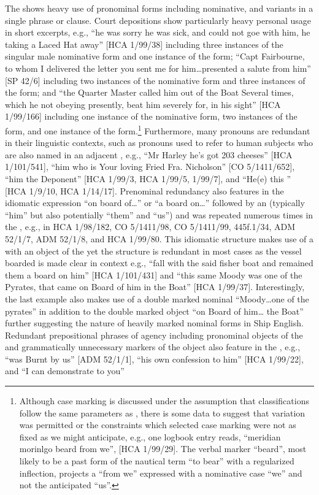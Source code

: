 The  shows heavy use of pronominal forms including nominative,  and  variants in a single phrase or clause. Court depositions show particularly heavy personal  usage in short excerpts, e.g., “he was sorry he was sick, and could not goe with him, he taking a Laced Hat away” [HCA 1/99/38] including three instances of the singular male  nominative form and one instance of the  form; “Capt Fairbourne, to whom I delivered the letter you sent me for him…presented a salute from him” [SP 42/6] including two instances of the nominative form and three instances of the  form; and “the Quarter Master called him out of the Boat Several times, which he not obeying presently, beat him severely for, in his sight” [HCA 1/99/166] including one instance of the nominative form, two instances of the  form, and one instance of the  form.\footnote{Although case marking is discussed under the assumption that classifications follow the same parameters as , there is some data to suggest that variation was permitted or the constraints which selected case marking were not as fixed as we might anticipate, e.g., one logbook entry reads, “meridian morinlgo beard from we”, [HCA 1/99/29]. The verbal marker “beard”, most likely to be a past form of the nautical term “to bear” with a regularized inflection, projects a  “from we” expressed with a nominative case  “we” and not the anticipated  “us”.} Furthermore, many pronouns are redundant in their linguistic contexts, such as pronouns used to refer to human subjects who are also named in an adjacent , e.g., “Mr Harley he’s got 203 cheeses” [HCA 1/101/541], “him who is Your loving Fried Fra. Nicholson” [CO 5/1411/652], “him the Deponent” [HCA 1/99/3, HCA 1/99/5, 1/99/7], and “He(e) this ” [HCA 1/9/10, HCA 1/14/17]. Prenominal redundancy also features in the idiomatic expression “on board of…” or “a board on…” followed by an   (typically “him” but also potentially “them” and “us”) and was repeated numerous times in the , e.g., in HCA 1/98/182, CO 5/1411/98, CO 5/1411/99, 445f.1/34, ADM 52/1/7, ADM 52/1/8, and HCA 1/99/80. This idiomatic structure makes use of a  with an  object of the  yet the structure is redundant in most cases as the vessel boarded is made clear in context e.g., “fall with the said fisher boat and remained them a board on him” [HCA 1/101/431] and “this same Moody was one of the Pyrates, that came on Board of him in the Boat” [HCA 1/99/37]. Interestingly, the last example also makes use of a double marked nominal “Moody…one of the pyrates” in addition to the double marked object “on Board of him… the Boat” further suggesting the nature of heavily marked nominal forms in Ship English. Redundant prepositional phrases of agency including pronominal objects of the  and grammatically unnecessary markers of the  object also feature in the , e.g., “was Burnt by us” [ADM 52/1/1], “his own confession to him” [HCA 1/99/22], and “I can demonstrate to you” 